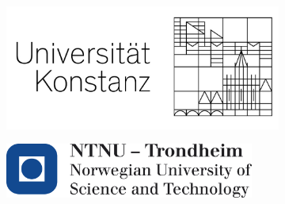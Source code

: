 \documentclass[twoside,a4paper]{article}
\begin{document}
\begin{figure}[H]
    \centering
    \begin{subfigure}{0.45\textwidth}
        \includegraphics[width=.8\textwidth]{Ressources/UniKn.png}
    \end{subfigure}\hspace*{0.1\textwidth}
    \begin{subfigure}{0.45\textwidth}
        \includegraphics[width=0.9\textwidth]{Ressources/ntnu.png}
        \vspace*{12pt}
    \end{subfigure}
\end{figure}


\newpage
 
\vspace*{7pt}

\newpage


    \tableofcontents
    \thispagestyle{empty}	
    
\newpage
    \setcounter{page}{1}
\end{document}
